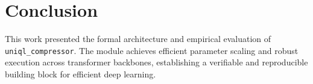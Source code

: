 \section{Conclusion}
This work presented the formal architecture and empirical evaluation of \texttt{uniql_compressor}. The module achieves efficient parameter scaling and robust execution across transformer backbones, establishing a verifiable and reproducible building block for efficient deep learning.
